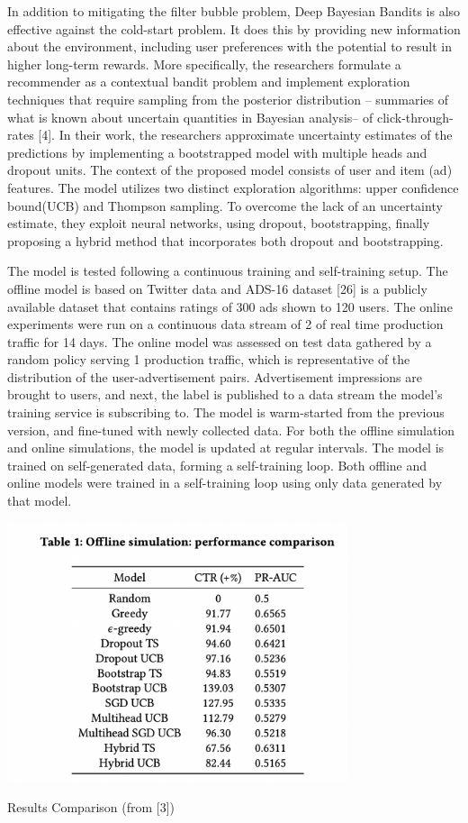 In addition to mitigating the filter bubble problem, Deep Bayesian Bandits is also effective against the cold-start problem. It does this by providing new information about the environment, including user preferences with the potential to result in  higher long-term rewards. More specifically, the researchers formulate a recommender as a contextual bandit problem and implement exploration techniques that require sampling from the posterior distribution -- summaries of what is known about uncertain quantities in Bayesian analysis-- of click-through-rates [4]. In their work, the researchers approximate uncertainty estimates of the predictions by implementing a bootstrapped model with multiple heads and dropout units. The context of the proposed model consists of user and item (ad) features. The model utilizes two distinct exploration algorithms: upper confidence bound(UCB) and Thompson sampling. To overcome the lack of an uncertainty estimate, they exploit neural networks, using dropout, bootstrapping, finally proposing a hybrid method that incorporates both dropout and bootstrapping. 

The model is tested following a continuous training and self-training setup. The offline model is based on Twitter data and ADS-16 dataset [26] is a publicly available dataset
that contains ratings of 300 ads shown to 120 users. The online experiments were run on a continuous data stream of 2\text{\%} of real time production traffic for 14 days. The online model was assessed on test data gathered by a random policy serving 1\text{\%} production traffic, which is representative of the distribution of the user-advertisement pairs.  Advertisement impressions are brought to users, and next, the label is published to a data stream the model’s training service is subscribing to. The model is warm-started from the previous version, and fine-tuned with newly collected data. For both the offline simulation and online simulations, the model is updated at regular intervals. The model is trained on self-generated data, forming a self-training loop. Both offline and online models were trained in a self-training loop using only data generated by that model. 

\begin{table}[hh!]
    \centering
    \includegraphics[width=100mm]{bandits_results.png}
    \caption{Results Comparison (from [3])
    \label{overflow}}
\end{table}

